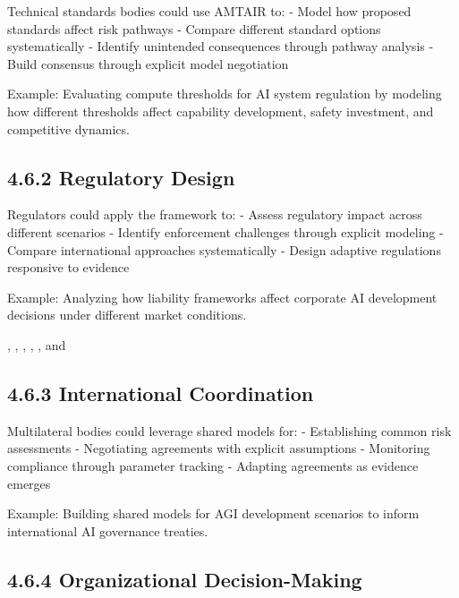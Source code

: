 \documentclass[
  11pt,
  letterpaper,
]{book}
\begin{document}
Technical standards bodies could use AMTAIR to: - Model how proposed
standards affect risk pathways - Compare different standard options
systematically - Identify unintended consequences through pathway
analysis - Build consensus through explicit model negotiation

Example: Evaluating compute thresholds for AI system regulation by
modeling how different thresholds affect capability development, safety
investment, and competitive dynamics.

\subsection*{4.6.2 Regulatory Design}\label{sec-regulatory-integration}

Regulators could apply the framework to: - Assess regulatory impact
across different scenarios - Identify enforcement challenges through
explicit modeling - Compare international approaches systematically -
Design adaptive regulations responsive to evidence

Example: Analyzing how liability frameworks affect corporate AI
development decisions under different market conditions.

\textcite{cuomo2016}, \textcite{demirag2000}, \textcite{devilliers2021},
\textcite{divito2022}, \textcite{kaur2024}, \textcite{list2011} and
\textcite{solomon2020}

\subsection*{4.6.3 International
Coordination}\label{sec-international-integration}

Multilateral bodies could leverage shared models for: - Establishing
common risk assessments - Negotiating agreements with explicit
assumptions - Monitoring compliance through parameter tracking -
Adapting agreements as evidence emerges

Example: Building shared models for AGI development scenarios to inform
international AI governance treaties.

\subsection*{4.6.4 Organizational
Decision-Making}\label{sec-organizational-integration}
\end{document}
